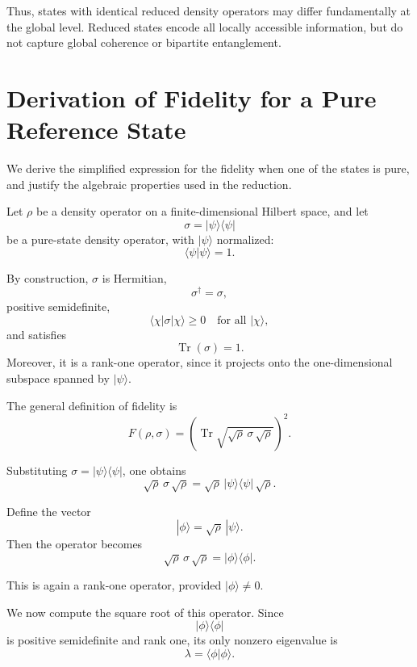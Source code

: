 \documentclass[a4paper]{article}
\begin{document}
Thus, states with identical reduced density operators may differ fundamentally at the global level. Reduced states encode all locally accessible information, but do not capture global coherence or bipartite entanglement.


\section{Derivation of Fidelity for a Pure Reference State}


We derive the simplified expression for the fidelity when one of the states is pure, and justify the algebraic properties used in the reduction.

\medskip

Let $\rho$ be a density operator on a finite-dimensional Hilbert space, and let
\[
\sigma = |\psi\rangle\langle\psi|
\]
be a pure-state density operator, with $|\psi\rangle$ normalized:
\[
\langle \psi | \psi \rangle = 1.
\]

By construction, $\sigma$ is Hermitian,
\[
\sigma^\dagger = \sigma,
\]
positive semidefinite,
\[
\langle \chi | \sigma | \chi \rangle \ge 0
\quad \text{for all } |\chi\rangle,
\]
and satisfies
\[
\operatorname{Tr}(\sigma) = 1.
\]
Moreover, it is a rank-one operator, since it projects onto the one-dimensional subspace spanned by $|\psi\rangle$.

\medskip

The general definition of fidelity is
\[
F(\rho,\sigma)
=
\left(\operatorname{Tr}\sqrt{\sqrt{\rho}\,\sigma\,\sqrt{\rho}}\right)^2.
\]

Substituting $\sigma = |\psi\rangle\langle\psi|$, one obtains
\[
\sqrt{\rho}\,\sigma\,\sqrt{\rho}
=
\sqrt{\rho}\,|\psi\rangle\langle\psi|\,\sqrt{\rho}.
\]

Define the vector
\[
|\phi\rangle = \sqrt{\rho}\,|\psi\rangle.
\]
Then the operator becomes
\[
\sqrt{\rho}\,\sigma\,\sqrt{\rho}
=
|\phi\rangle\langle\phi|.
\]

This is again a rank-one operator, provided $|\phi\rangle \neq 0$.

\medskip

We now compute the square root of this operator. Since
\[
|\phi\rangle\langle\phi|
\]
is positive semidefinite and rank one, its only nonzero eigenvalue is
\[
\lambda = \langle \phi | \phi \rangle.
\]
\end{document}
